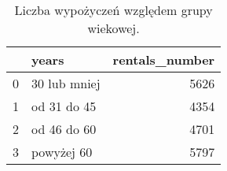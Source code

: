 \begin{table}[h]
\centering
\caption{Liczba wypożyczeń względem grupy wiekowej.}\label{tab:age_rent}
\begin{tabular}{rlr}
\hline
    & years        &   rentals\_number \\
\hline
  0 & 30 lub mniej &             5626 \\
  1 & od 31 do 45  &             4354 \\
  2 & od 46 do 60  &             4701 \\
  3 & powyżej 60   &             5797 \\
\hline
\end{tabular}\end{table}